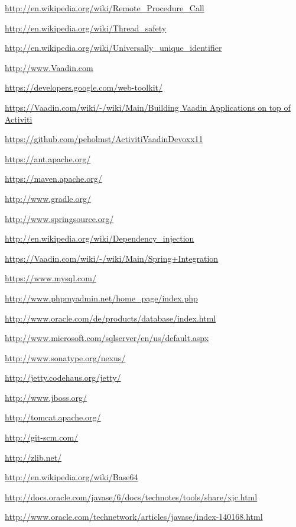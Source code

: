 \documentclass[paper=a4,twoside=false,BCOR=0mm,DIV=calc,fontsize=12pt]{scrartcl}
\begin{document}
\begin{thebibliography}{99}
 \url{http://en.wikipedia.org/wiki/Remote_Procedure_Call}

 \url{http://en.wikipedia.org/wiki/Thread_safety}

 \url{http://en.wikipedia.org/wiki/Universally_unique_identifier}

 \url{http://www.Vaadin.com}

 \url{https://developers.google.com/web-toolkit/}

 \url{https://Vaadin.com/wiki/-/wiki/Main/Building Vaadin Applications on top of Activiti}

 \url{https://github.com/peholmst/ActivitiVaadinDevoxx11}

 \url{https://ant.apache.org/}

 \url{https://maven.apache.org/}

 \url{http://www.gradle.org/}

 \url{http://www.springsource.org/}

 \url{http://en.wikipedia.org/wiki/Dependency_injection}

 \url{https://Vaadin.com/wiki/-/wiki/Main/Spring+Integration}

 \url{https://www.mysql.com/}

 \url{http://www.phpmyadmin.net/home_page/index.php}

 \url{http://www.oracle.com/de/products/database/index.html}

 \url{http://www.microsoft.com/sqlserver/en/us/default.aspx}

 \url{http://www.sonatype.org/nexus/}

 \url{http://jetty.codehaus.org/jetty/}

 \url{http://www.jboss.org/}

 \url{http://tomcat.apache.org/}

 \url{http://git-scm.com/}

 \url{http://zlib.net/}

 \url{http://en.wikipedia.org/wiki/Base64}

 \url{http://docs.oracle.com/javase/6/docs/technotes/tools/share/xjc.html}

 \url{http://www.oracle.com/technetwork/articles/javase/index-140168.html}

\end{thebibliography}
\end{document}

